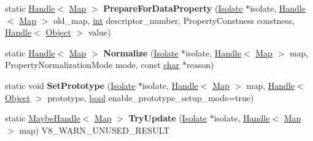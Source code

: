 \begin{DoxyCompactItemize}
\item 
\mbox{\label{classv8_1_1internal_1_1Map_a9630acca4dbcdf078a1433db44b5f3b8}} 
static \mbox{\hyperlink{classv8_1_1internal_1_1Handle}{Handle}}$<$ \mbox{\hyperlink{classv8_1_1internal_1_1Map}{Map}} $>$ {\bfseries Prepare\+For\+Data\+Property} (\mbox{\hyperlink{classv8_1_1internal_1_1Isolate}{Isolate}} $\ast$isolate, \mbox{\hyperlink{classv8_1_1internal_1_1Handle}{Handle}}$<$ \mbox{\hyperlink{classv8_1_1internal_1_1Map}{Map}} $>$ old\+\_\+map, \mbox{\hyperlink{classint}{int}} descriptor\+\_\+number, Property\+Constness constness, \mbox{\hyperlink{classv8_1_1internal_1_1Handle}{Handle}}$<$ \mbox{\hyperlink{classv8_1_1internal_1_1Object}{Object}} $>$ value)
\item 
\mbox{\label{classv8_1_1internal_1_1Map_ad98226df881a74b1f417fe40bb579c0e}} 
static \mbox{\hyperlink{classv8_1_1internal_1_1Handle}{Handle}}$<$ \mbox{\hyperlink{classv8_1_1internal_1_1Map}{Map}} $>$ {\bfseries Normalize} (\mbox{\hyperlink{classv8_1_1internal_1_1Isolate}{Isolate}} $\ast$isolate, \mbox{\hyperlink{classv8_1_1internal_1_1Handle}{Handle}}$<$ \mbox{\hyperlink{classv8_1_1internal_1_1Map}{Map}} $>$ map, Property\+Normalization\+Mode mode, const \mbox{\hyperlink{classchar}{char}} $\ast$reason)
\item 
\mbox{\label{classv8_1_1internal_1_1Map_acf8966a76c07770fdd9affd525b7ca6f}} 
static void {\bfseries Set\+Prototype} (\mbox{\hyperlink{classv8_1_1internal_1_1Isolate}{Isolate}} $\ast$isolate, \mbox{\hyperlink{classv8_1_1internal_1_1Handle}{Handle}}$<$ \mbox{\hyperlink{classv8_1_1internal_1_1Map}{Map}} $>$ map, \mbox{\hyperlink{classv8_1_1internal_1_1Handle}{Handle}}$<$ \mbox{\hyperlink{classv8_1_1internal_1_1Object}{Object}} $>$ prototype, \mbox{\hyperlink{classbool}{bool}} enable\+\_\+prototype\+\_\+setup\+\_\+mode=true)
\item 
\mbox{\label{classv8_1_1internal_1_1Map_a43e909e42bb38750263f7177b9367005}} 
static \mbox{\hyperlink{classv8_1_1internal_1_1MaybeHandle}{Maybe\+Handle}}$<$ \mbox{\hyperlink{classv8_1_1internal_1_1Map}{Map}} $>$ {\bfseries Try\+Update} (\mbox{\hyperlink{classv8_1_1internal_1_1Isolate}{Isolate}} $\ast$isolate, \mbox{\hyperlink{classv8_1_1internal_1_1Handle}{Handle}}$<$ \mbox{\hyperlink{classv8_1_1internal_1_1Map}{Map}} $>$ map) V8\+\_\+\+W\+A\+R\+N\+\_\+\+U\+N\+U\+S\+E\+D\+\_\+\+R\+E\+S\+U\+LT

\end{DoxyCompactItemize}
